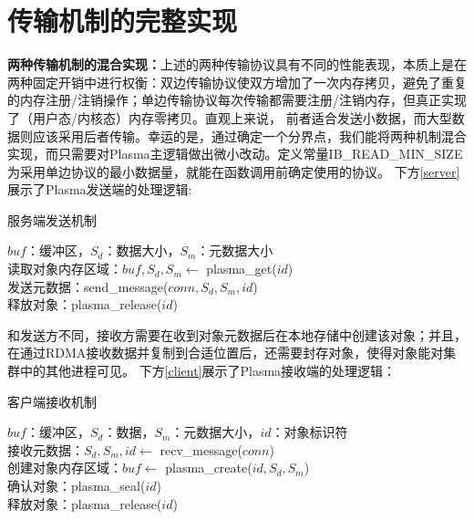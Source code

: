 \section{传输机制的完整实现}

\textbf{两种传输机制的混合实现：}上述的两种传输协议具有不同的性能表现，本质上是在两种固定开销中进行权衡：双边传输协议使双方增加了一次内存拷贝，避免了重复的内存注册/注销操作；单边传输协议每次传输都需要注册/注销内存，但真正实现了（用户态/内核态）内存零拷贝。直观上来说，
前者适合发送小数据，而大型数据则应该采用后者传输。幸运的是，通过确定一个分界点，我们能将两种机制混合实现，而只需要对Plasma主逻辑做出微小改动。定义常量IB\_READ\_MIN\_SIZE为采用单边协议的最小数据量，就能在函数调用前确定使用的协议。
下方\autoref{server}展示了Plasma发送端的处理逻辑:

\begin{algorithm}[H]
	\caption{服务端发送机制}\label{server}
	$buf$：缓冲区，$S_d$：数据大小，$S_m$：元数据大小 \\
	读取对象内存区域：$buf, S_d, S_m \leftarrow$ plasma\_get($id$) \\
	发送元数据：send\_message($conn, S_d, S_m, id$) \\
	释放对象：plasma\_release($id$)
\end{algorithm}

和发送方不同，接收方需要在收到对象元数据后在本地存储中创建该对象；并且，在通过RDMA接收数据并复制到合适位置后，还需要封存对象，使得对象能对集群中的其他进程可见。
下方\autoref{client}展示了Plasma接收端的处理逻辑：

\begin{algorithm}[H]
	\caption{客户端接收机制}\label{client}
	$buf$：缓冲区，$S_d$：数据，$S_m$：元数据大小，$id$：对象标识符 \\
	接收元数据：$S_d, S_m, id \leftarrow$ recv\_message($conn$) \\
	创建对象内存区域：$buf \leftarrow$ plasma\_create($id, S_d, S_m$) \\
	确认对象：plasma\_seal($id$) \\
	释放对象：plasma\_release($id$) \\
\end{algorithm}

